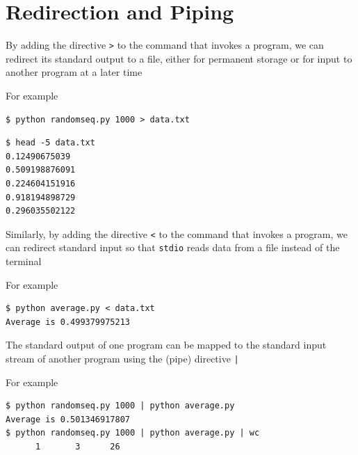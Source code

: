 \documentclass[8pt,a4paper,compress]{beamer}
\begin{document}
\section{Redirection and Piping}
\begin{frame}[fragile]
\pause

By adding the directive \lstinline{>} to the command that invokes a program, we can redirect its standard output to a file, either for permanent storage or for input to another program at a later time

\pause
\bigskip

For example
\begin{lstlisting}[language={}]
$ python randomseq.py 1000 > data.txt
\end{lstlisting}

\begin{lstlisting}[language={}]
$ head -5 data.txt 
0.12490675039
0.509198876091
0.224604151916
0.918194898729
0.296035502122
\end{lstlisting}

\pause
\bigskip

Similarly, by adding the directive \lstinline{<} to the command that invokes a program, we can redirect standard input so that \lstinline{stdio} reads data from a file instead of the terminal

\pause
\bigskip

For example
\begin{lstlisting}[language={}]
$ python average.py < data.txt
Average is 0.499379975213
\end{lstlisting}

\pause
\bigskip

The standard output of one program can be mapped to the standard input stream of another program using the (pipe) directive \lstinline{|}

\pause
\bigskip

For example
\begin{lstlisting}[language={}]
$ python randomseq.py 1000 | python average.py 
Average is 0.501346917807
$ python randomseq.py 1000 | python average.py | wc
      1       3      26
\end{lstlisting}
\end{frame}
\end{document}
